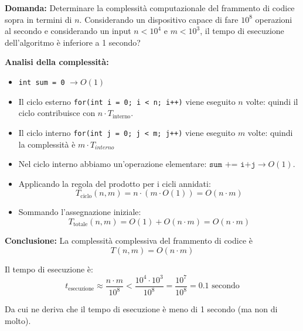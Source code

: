 \textbf{Domanda:}  
Determinare la complessità computazionale del frammento di codice sopra in termini di $n$.
Considerando un dispositivo capace di fare $10^8$ operazioni al secondo e considerando un input $n <10^4$ e $m < 10^3$, il tempo di esecuzione dell'algoritmo è inferiore a 1 secondo?

\textbf{Analisi della complessità:}

\begin{itemize}
	\item \texttt{int sum = 0} $\rightarrow O(1)$
	
	\item Il ciclo esterno \texttt{for(int i = 0; i < n; i++)} viene eseguito $n$ volte:
	quindi il ciclo contribuisce con $n \cdot T_{\text{interno}}$.
	
	\item Il ciclo interno \texttt{for(int j = 0; j < m; j++)} viene eseguito $m$ volte:
	quindi la complessità è $m \cdot T_{interno}$
	
	\item Nel ciclo interno abbiamo un'operazione elementare: $\texttt{sum += i+j} \rightarrow O(1)$.
	
	\item Applicando la regola del prodotto per i cicli annidati:
	\[
	T_{\text{ciclo}}(n,m) = n \cdot (m \cdot O(1)) = O(n \cdot m)
	\]
	
	\item Sommando l'assegnazione iniziale:
	\[
	T_{\text{totale}}(n,m) = O(1) + O(n \cdot m) = O(n \cdot m)
	\]
\end{itemize}

\textbf{Conclusione:}  
La complessità complessiva del frammento di codice è
\[
T(n,m) = O(n \cdot m)
\]


Il tempo di esecuzione è:
\[
t_{\text{esecuzione}} \approx \frac{n \cdot m}{10^8} < \frac{10^4 \cdot 10^3}{10^8} = \frac{10^7}{10^8} = 0.1 \text{ secondo}
\]

\noindent
Da cui ne deriva che il tempo di esecuzione è meno di 1 secondo (ma non di molto).


